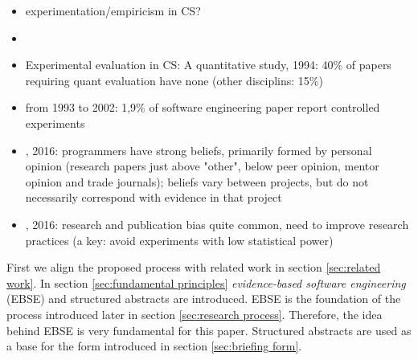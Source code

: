 \begin{itemize}
\item experimentation/empiricism in CS?
\item {}
\item Experimental evaluation in CS: A quantitative study, 1994: 40\% of papers requiring quant evaluation have none (other disciplins: 15\%)
\item {} from 1993 to 2002: 1,9\% of software engineering paper report controlled experiments
\item {}, 2016: programmers have strong beliefs, primarily formed by personal opinion (research papers just above "other", below peer opinion, mentor opinion and trade journals); beliefs vary between projects, but do not necessarily correspond with evidence in that project
\item {}, 2016: research and publication bias quite common, need to improve research practices (a key: avoid experiments with low statistical power)
\end{itemize}

First we align the proposed process with related work in section \ref{sec:related work}. In section \ref{sec:fundamental principles} \emph{evidence-based software engineering} (EBSE) and structured abstracts are introduced. EBSE is the foundation of the process introduced later in section \ref{sec:research process}. Therefore, the idea behind EBSE is very fundamental  for this paper.
Structured abstracts are used as a base for the form introduced in section \ref{sec:briefing form}.\\














